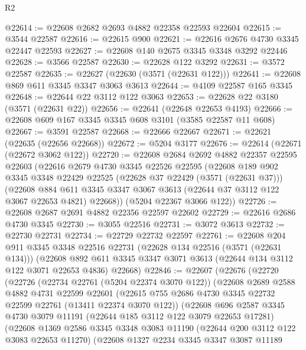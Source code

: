 \begin{lexlean}{R2}
\begin{coremodule}
@22614 := @22608 @2682 @2693 @4882 @22358 @22593 @22604
@22615 := @3544 @22587
@22616 := @22615 @900
@22621 := @22616 @2676 @4730 @3345 @22447 @22593
@22627 := @22608 @140 @2675 @3345 @3348 @3292 @22446
@22628 := @3566 @22587
@22630 := @22628 @122 @3292
@22631 := @3572 @22587
@22635 := @22627 (@22630 (@3571 (@22631 @122)))
@22641 := @22608 @869 @611 @3345 @3347 @3063 @3613
@22644 := @4109 @22587 @165 @3345
@22648 := @22644 @22 @3112 @122 @3063
@22653 := @22628 @22 @3180 (@3571 (@22631 @22))
@22656 := @22641 (@22648 @22653 @4193)
@22666 := @22608 @609 @167 @3345 @3345 @608 @3101 (@3585 @22587 @11 @608)
@22667 := @3591 @22587
@22668 := @22666 @22667
@22671 := @22621 (@22635 (@22656 @22668))
@22672 := @5204 @3177
@22676 := @22614 (@22671 (@22672 @3062 @122))
@22720 := @22608
    @2684
    @2692
    @4882
    @22357
    @22595
    @22603
    (@22616
      @2679
      @4730
      @3345
      @22526
      @22595
      (@22608
        @189
        @902
        @3345
        @3348
        @22429
        @22525
        (@22628 @37 @22429 (@3571 (@22631 @37)))
        (@22608
          @884
          @611
          @3345
          @3347
          @3067
          @3613
          (@22644 @37 @3112 @122 @3067 @22653 @4821)
          @22668))
      (@5204 @22367 @3066 @122))
@22726 := @22608 @2687 @2691 @4882 @22356 @22597 @22602
@22729 := @22616 @2686 @4730 @3345
@22730 := @3055 @22516
@22731 := @3072 @3613
@22732 := @22730 @22731
@22734 := @22729 @22732 @22597
@22761 := @22608
    @204
    @911
    @3345
    @3348
    @22516
    @22731
    (@22628 @134 @22516 (@3571 (@22631 @134)))
    (@22608 @892 @611 @3345 @3347 @3071 @3613 (@22644 @134 @3112 @122 @3071 @22653 @4836) @22668)
@22846 := @22607
    (@22676
      (@22720
        (@22726
          (@22734 @22761 (@5204 @22374 @3070 @122))
          (@22608
            @2689
            @2588
            @4882
            @4731
            @22599
            @22601
            (@22615 @755 @2686 @4730 @3345 @22732 @22599 @22761 (@13411 @22374 @3070 @122))
            (@22608
              @696
              @2587
              @3345
              @4730
              @3079
              @11191
              (@22644 @185 @3112 @122 @3079 @22653 @17281)
              (@22608
                @1369
                @2586
                @3345
                @3348
                @3083
                @11190
                (@22644 @200 @3112 @122 @3083 @22653 @11270)
                (@22608
                  @1327
                  @2234
                  @3345
                  @3347
                  @3087
                  @11189

\end{coremodule}
\end{lexlean}
